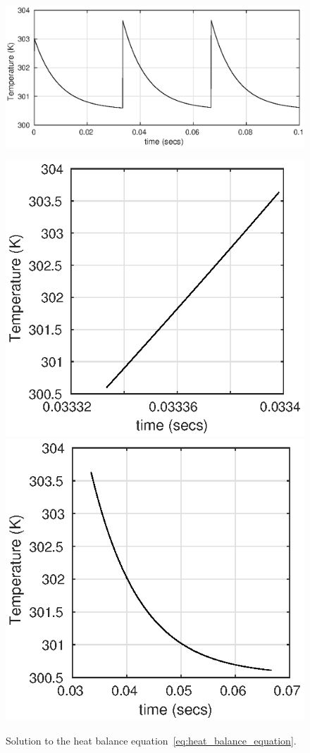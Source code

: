 \begin{figure} 
\includegraphics[scale=0.9]{gfx/fig1_several_pulses.eps} 
\caption{Solution to the heat balance equation~\eqref{eq:heat_balance_equation}.} \label{fig:solution_heat_balance_eq}
\includegraphics[scale=0.9]{gfx/fig1_int_time.eps} 
\includegraphics[scale=0.9]{gfx/fig1_cooling.eps} 

\end{figure}
